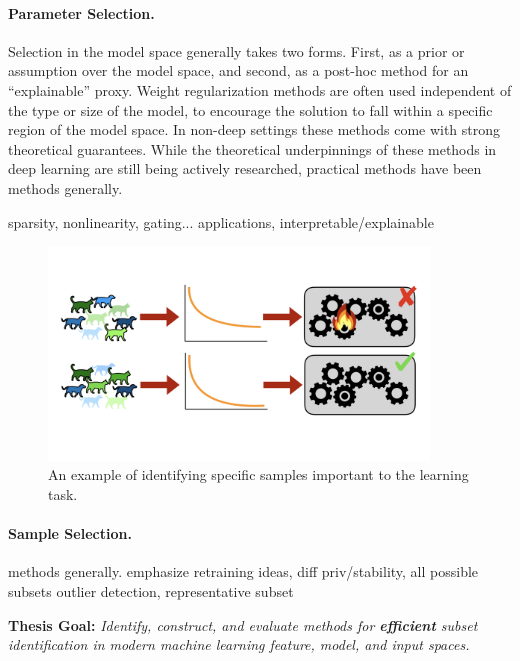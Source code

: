\paragraph{Parameter Selection.} 
Selection in the model space generally takes two forms. First, as a prior or assumption over the model space, and second, as a post-hoc method for an ``explainable'' proxy.
Weight regularization methods are often used independent of the type or size of the model, to encourage the solution to fall within a specific region of the model space. In non-deep settings these methods come with strong theoretical guarantees. 
While the theoretical underpinnings of these methods in deep learning are still being actively researched,
practical methods have been
methods generally. 

 sparsity, nonlinearity, gating...
applications, interpretable/explainable

\begin{figure}
    \centering
    \includegraphics[trim={0 4.5cm 0 4cm},clip,width=0.9\textwidth]{diss/1_intro/figs/sample_select.png}
    \caption[Visualization of sample selection]{An example of identifying specific samples important to the learning task.}
    \label{fig:sample_select}
\end{figure}
\paragraph{Sample Selection.} methods generally. emphasize retraining ideas, diff priv/stability, all possible subsets
outlier detection, representative subset

\begin{mdframed}[style=MyFrame]
\textbf{ Thesis Goal: }
\em Identify, construct, and evaluate methods for \textbf{efficient} subset identification in modern machine learning feature, model, and input spaces.
\end{mdframed}

